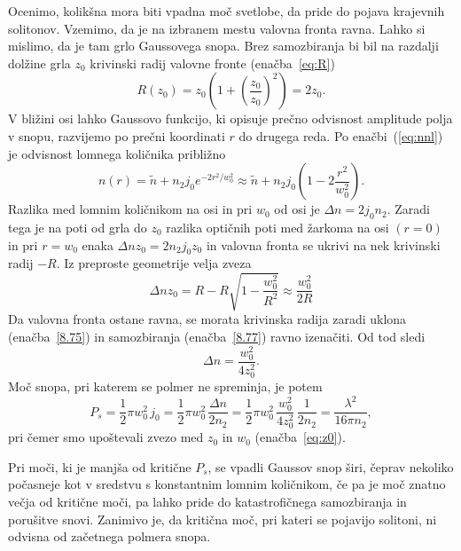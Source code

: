 Ocenimo, kolikšna mora biti vpadna moč svetlobe, da pride do pojava krajevnih solitonov. 
Vzemimo, da je na izbranem mestu valovna fronta ravna. Lahko si mislimo,
da je tam grlo Gaussovega snopa. Brez samozbiranja bi bil na razdalji
dolžine grla $z_{0}$ krivinski radij valovne fronte (enačba~\ref{eq:R})
\begin{equation}
R(z_{0})=z_{0}\left( 1+\left(\frac{z_{0}}{z_{0}}\right)^{2}\right)=2z_{0}.
\label{8.75}
\end{equation}
V bližini osi lahko Gaussovo funkcijo, ki opisuje prečno odvisnost
amplitude polja v snopu, razvijemo po prečni koordinati $r$ do drugega
reda. Po enačbi~(\ref{eq:nnl}) je odvisnost lomnega količnika približno
\begin{equation}
n(r)=\tilde{n}+n_2 j_0 e^{-2r^2/w_0^2} \approx \tilde{n}+n_2 j_0 \left(1 - 2\frac{r^2}{w_0^2}\right).
\label{8.76}
\end{equation}
Razlika med lomnim količnikom na osi in pri $w_{0}$ od osi je $\Delta n= 2j_{0} n_{2}$.
Zaradi tega je na poti od grla do $z_0$ razlika optičnih poti med žarkoma na osi $(r=0)$ in 
pri $r= w_{0}$ enaka $\Delta nz_{0} = 2 n_2 j_0 z_0$ in valovna fronta se 
ukrivi na nek krivinski radij $-R$. Iz preproste geometrije velja zveza 
\begin{equation}
\Delta nz_{0}=R-R\sqrt{1-\frac{w_{0}^{2}}{R^{2}}}\approx \frac{w_{0}^{2}}{2R}
\label{8.77}
\end{equation}
Da valovna fronta ostane ravna, se morata krivinska radija zaradi uklona 
(enačba~\ref{8.75}) in samozbiranja (enačba~\ref{8.77}) ravno izenačiti. 
Od tod sledi 
\begin{equation}
\Delta n=\frac{w_{0}^{2}}{4z_{0}^{2}}.
\label{8.78}
\end{equation}
Moč snopa, pri katerem se polmer ne spreminja, je potem 
\begin{equation}
P_{s}= \frac{1}{2}\pi w_0^2 \,j_0 = \frac{1}{2}\pi w_0^2 \, \frac{\Delta n}{2 n_2} = 
\frac{1}{2}\pi w_0^2 \,\frac{w_{0}^{2}}{4z_{0}^{2}}\,\frac{1}{2 n_2} = \frac{\lambda^2}{16 \pi n_2},
\label{8.79}
\end{equation}
pri čemer smo upoštevali zvezo med $z_0$ in $w_0$ (enačba~\ref{eq:z0}).

Pri moči, ki je manjša od kritične $P_s$, se vpadli Gaussov snop širi, 
čeprav nekoliko počasneje kot v sredstvu s konstantnim lomnim količnikom, 
če pa je moč znatno večja od kritične moči, pa lahko
pride do katastrofičnega samozbiranja in porušitve snovi.
Zanimivo je, da kritična moč, pri kateri se pojavijo solitoni, 
ni odvisna od začetnega polmera snopa.

